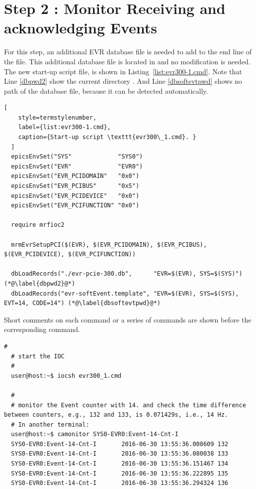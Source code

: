 \documentclass[11pt
  , a4paper
  , article
  , oneside
  , showtrims
]{memoir}
\begin{document}
\section{Step 2 : Monitor Receiving and acknowledging Events}
For this step, an additional EVR database file is needed to add to the end line of the  file. This additional database file is located in  and no modification is needed. The new start-up script file,  is shown in Listing~\ref{list:evr300-1.cmd}. Note that Line \ref{dbpwd2} show the current directory . And Line \ref{dbsoftevtpwd} shows no path of the database file, because it can be detected automatically. 
\begin{lstlisting}[
    style=termstylenumber,
    label={list:evr300-1.cmd},
    caption={Start-up script \texttt{evr300\_1.cmd}. }
  ]
  epicsEnvSet("SYS"             "SYS0")
  epicsEnvSet("EVR"             "EVR0")
  epicsEnvSet("EVR_PCIDOMAIN"   "0x0") 
  epicsEnvSet("EVR_PCIBUS"      "0x5") 
  epicsEnvSet("EVR_PCIDEVICE"   "0x0") 
  epicsEnvSet("EVR_PCIFUNCTION" "0x0") 
  
  require mrfioc2
  
  mrmEvrSetupPCI($(EVR), $(EVR_PCIDOMAIN), $(EVR_PCIBUS), $(EVR_PCIDEVICE), $(EVR_PCIFUNCTION))
    
  dbLoadRecords("./evr-pcie-300.db",      "EVR=$(EVR), SYS=$(SYS)") (*@\label{dbpwd2}@*)
  dbLoadRecords("evr-softEvent.template", "EVR=$(EVR), SYS=$(SYS), EVT=14, CODE=14") (*@\label{dbsoftevtpwd}@*)
\end{lstlisting}

Short comments on each command or a series of commands are shown before the corresponding command.

\begin{lstlisting}[style=termstylenumber]
  #
  # start the IOC
  #
  user@host:~$ iocsh evr300_1.cmd

  #
  # monitor the Event counter with 14. and check the time difference between counters, e.g., 132 and 133, is 0.071429s, i.e., 14 Hz.
  # In another terminal:
  user@host:~$ camonitor SYS0-EVR0:Event-14-Cnt-I
  SYS0-EVR0:Event-14-Cnt-I       2016-06-30 13:55:36.008609 132
  SYS0-EVR0:Event-14-Cnt-I       2016-06-30 13:55:36.080038 133
  SYS0-EVR0:Event-14-Cnt-I       2016-06-30 13:55:36.151467 134
  SYS0-EVR0:Event-14-Cnt-I       2016-06-30 13:55:36.222895 135
  SYS0-EVR0:Event-14-Cnt-I       2016-06-30 13:55:36.294324 136
\end{lstlisting}
\end{document}
